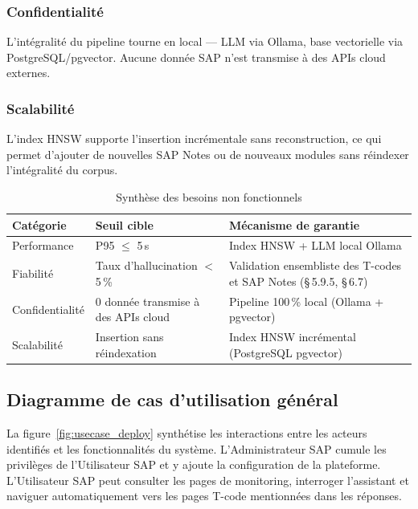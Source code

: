 \subsubsection{Confidentialité}

L'intégralité du pipeline tourne en local — LLM via Ollama, base vectorielle via PostgreSQL/pgvector. Aucune donnée SAP n'est transmise à des APIs cloud externes.

\subsubsection{Scalabilité}

L'index HNSW supporte l'insertion incrémentale sans reconstruction, ce qui permet d'ajouter de nouvelles SAP Notes ou de nouveaux modules sans réindexer l'intégralité du corpus.

\begin{table}[H]
\centering
\renewcommand{\arraystretch}{1.3}
\caption{Synthèse des besoins non fonctionnels}
\label{tab:nfr_synthese}
\begin{tabularx}{\textwidth}{|p{3cm}|p{4cm}|X|}
\hline
\textbf{Catégorie} & \textbf{Seuil cible} & \textbf{Mécanisme de garantie} \\
\hline
Performance & P95 $\leq$ 5\,s & Index HNSW + LLM local Ollama \\
\hline
Fiabilité & Taux d'hallucination $<$ 5\,\% & Validation ensembliste des T-codes et SAP Notes (§\,5.9.5, §\,6.7) \\
\hline
Confidentialité & 0 donnée transmise à des APIs cloud & Pipeline 100\,\% local (Ollama + pgvector) \\
\hline
Scalabilité & Insertion sans réindexation & Index HNSW incrémental (PostgreSQL pgvector) \\
\hline
\end{tabularx}
\end{table}

\subsection{Diagramme de cas d'utilisation général}

La figure~\ref{fig:usecase_deploy} synthétise les interactions entre les acteurs identifiés et les fonctionnalités du système. L'Administrateur SAP cumule les privilèges de l'Utilisateur SAP et y ajoute la configuration de la plateforme. L'Utilisateur SAP peut consulter les pages de monitoring, interroger l'assistant et naviguer automatiquement vers les pages T-code mentionnées dans les réponses.

